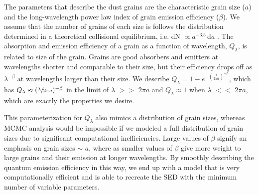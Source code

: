 The parameters that describe the dust grains are the characteristic grain size ($a$) and the long-wavelength power law index of grain emission efficiency ($\beta$). We assume that the number of grains of each size is follows the distribution determined in a theoretical collisional equilibrium, i.e. dN $\propto a^{-3.5}$\,d$a$ \citep{Thib07}. The absorption and emission efficiency of a grain as a function of wavelength, $Q_{\lambda}$, is related to size of the grain. Grains are good absorbers and emitters at wavelengths shorter and comparable to their size, but their efficiency drops off as $\lambda^{-\beta}$ at wavelengths larger than their size. We describe $Q_{\lambda} = 1 - e^{-(\frac{\lambda}{2\pi a})^{-\beta}}$, which has $Q_{\lambda} \approx (\sfrac{\lambda}{2\pi a})^{-\beta}$ in the limit of $\lambda$ $>>$ $2\pi a$ and $Q_{\lambda} \approx 1$ when $\lambda$ $<<$ $2\pi a$, which are exactly the properties we desire. 

This parameterization for $Q_{\lambda}$ also mimics a distribution of grain sizes, whereas MCMC analysis would be impossible if we modeled a full distribution of grain sizes due to significant computational inefficiencies. Large values of $\beta$ signify an emphasis on grain sizes $\sim$ $a$, where as smaller values of $\beta$ give more weight to large grains and their emission at longer wavelengths. By smoothly describing the quantum emission efficiency in this way, we end up with a model that is very computationally efficient and is able to recreate the SED with the minimum number of variable parameters. 








